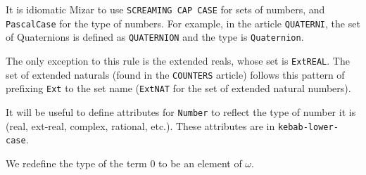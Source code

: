 \documentclass{article}
\begin{document}
\begin{remark}%
It is idiomatic Mizar to use \texttt{SCREAMING CAP CASE} for sets of
numbers, and \texttt{PascalCase} for the type of numbers. For example,
in the article \texttt{QUATERNI}, the set of Quaternions is defined as
\texttt{QUATERNION} and the type is \texttt{Quaternion}.

The only exception to this rule is the extended reals, whose set is
\verb#ExtREAL#. The set of extended naturals (found in the
\verb#COUNTERS# article) follows this pattern of prefixing \verb#Ext# to
the set name (\verb#ExtNAT# for the set of extended natural numbers).

It will be useful to define attributes for \verb#Number# to reflect the
type of number it is (real, ext-real, complex, rational, etc.). These
attributes are in \texttt{kebab-lower-case}.
\end{remark}

\begin{definition}
We redefine the type of the term $0$ to be an element of $\omega$.
\end{definition}
\end{document}
